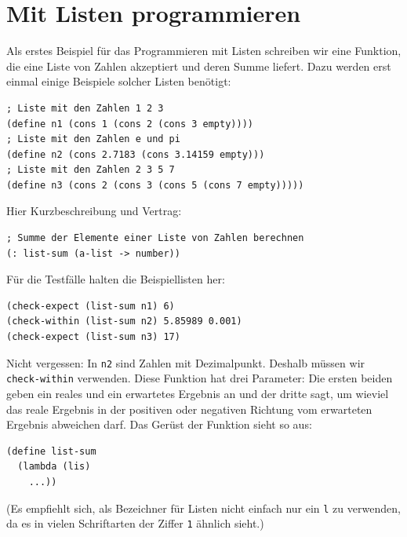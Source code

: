 \section{Mit Listen programmieren}

Als erstes Beispiel für das Programmieren mit Listen schreiben wir
eine Funktion, die eine Liste von Zahlen akzeptiert und deren Summe
liefert.  Dazu werden erst einmal einige Beispiele solcher Listen
benötigt:
%
\begin{verbatim}
; Liste mit den Zahlen 1 2 3
(define n1 (cons 1 (cons 2 (cons 3 empty))))
; Liste mit den Zahlen e und pi
(define n2 (cons 2.7183 (cons 3.14159 empty)))
; Liste mit den Zahlen 2 3 5 7
(define n3 (cons 2 (cons 3 (cons 5 (cons 7 empty)))))
\end{verbatim}

Hier Kurzbeschreibung und Vertrag:\label{sec:list-sum}
%
\begin{verbatim}
; Summe der Elemente einer Liste von Zahlen berechnen
(: list-sum (a-list -> number))
\end{verbatim}
%
Für die Testfälle halten die Beispiellisten her:
%
\begin{verbatim}
(check-expect (list-sum n1) 6)
(check-within (list-sum n2) 5.85989 0.001)
(check-expect (list-sum n3) 17)
\end{verbatim}
%
Nicht vergessen: In \texttt{n2} sind Zahlen mit Dezimalpunkt.
Deshalb müssen wir \texttt{check-within} verwenden.  Diese Funktion
hat drei Parameter: Die ersten beiden geben ein reales und ein
erwartetes Ergebnis an
und der dritte sagt, um wieviel das reale Ergebnis in der positiven
oder negativen Richtung vom erwarteten Ergebnis abweichen darf. Das Gerüst der
Funktion sieht so aus:
%
\begin{verbatim}
(define list-sum
  (lambda (lis)
    ...))
\end{verbatim}
%
(Es empfiehlt sich, als Bezeichner für Listen nicht einfach nur ein
\texttt{l} zu verwenden, da es in vielen Schriftarten der Ziffer
\texttt{1} ähnlich sieht.)

